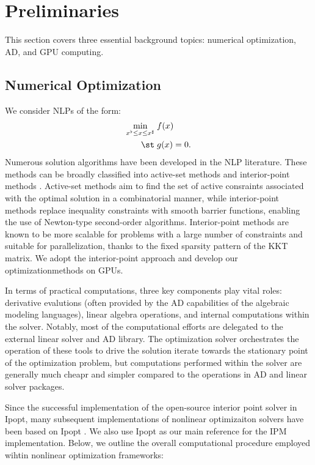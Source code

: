 \section{Preliminaries}\label{sec:prelim}
This section covers three essential background topics: numerical
optimization, AD, and GPU computing.

\subsection{Numerical Optimization}\label{sec:numopt}
We consider NLPs of the form:
\begin{subequations}\label{eqn:cpt}
  \begin{align}
    \min_{x^\flat \leq x \leq x^\sharp}\;
    & f(x)\\
    \st\;
    & g(x) =0. \label{eqn:cpt-con}
  \end{align} 
\end{subequations}
Numerous solution algorithms have been developed in the NLP
literature.  These methods can be broadly classified into active-set
methods and interior-point methods \cite{nocedal2006numerical}.
Active-set methods aim to find the set of active consraints associated
with the optimal solution in a combinatorial manner, while
interior-point methods replace inequality constraints with smooth
barrier functions, enabling the use of Newton-type second-order
algorithms. Interior-point methods are known to be more scalable for
problems with a large number of constraints and suitable for
parallelization, thanks to the fixed sparsity pattern of the KKT
matrix. We adopt the interior-point approach and develop our
optimizationmethods on GPUs.

In terms of practical computations, three key components play
vital roles: derivative evalutions (often provided by the AD
capabilities of the algebraic modeling languages), linear algebra
operations, and internal computations within the solver. Notably, most
of the computational efforts are delegated to the external linear
solver and AD library. The optimization solver
orchestrates the operation of these tools to drive the solution
iterate towards the stationary point of the optimization problem, but
computations performed within the solver are generally much cheapr and
simpler compared to the operations in AD and linear solver packages.

Since the successful implementation of the open-source interior point
solver in Ipopt, many subsequent implementations of nonlinear
optimizaiton solvers
\cite{chiang2014structured,rodriguez2023scalable,shin2021graph} have
been based on Ipopt \cite{wachter2006implementation}. We also use
Ipopt as our main reference for the IPM implementation. Below, we
outline the overall computational procedure employed wihtin nonlinear
optimization frameworks:

